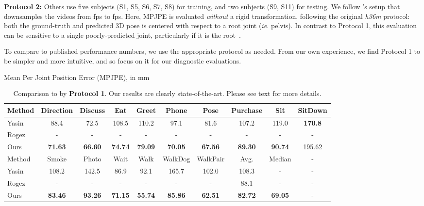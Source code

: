 \documentclass[10pt,twocolumn,letterpaper]{article}
\begin{document}
\textbf{Protocol 2:} Others \cite{Zhou_2016_CVPR,Tekin_2016_CVPR,li20143d} use five subjects (S1, S5, S6, S7, S8)  for training, and two subjects (S9, S11) for testing. We follow \cite{Zhou_2016_CVPR}'s setup that downsamples the videos from  fps to  fps.
Here, MPJPE is evaluated {\em without} a rigid transformation, following the original \textit{h36m} protocol: both the ground-truth and predicted 3D pose is centered with respect to a root joint (\textit{ie.} pelvis). In contrast to Protocol 1, this evaluation can be sensitive to a single poorly-predicted joint, particularly if it is the root~\cite{h36m_pami}.

To compare to published performance numbers, we use the appropriate protocol as needed. From our own experience, we find Protocol 1 to be simpler and more intuitive, and so focus on it for our diagnostic evaluations.



\begin{table*}[t!]
\centering
Mean Per Joint Position Error (MPJPE), in mm\\
\begin{tabular}{|l|c|c|c|c|c|c|c|c|c|}
\hline
Method & Direction & Discuss & Eat & Greet & Phone & Pose & Purchase & Sit & SitDown\\
\hline
\hline
Yasin \cite{Yasin_2016_CVPR}& 88.4 & 72.5 & 108.5 & 110.2 & 97.1 & 81.6 & 107.2 & 119.0 & \textbf{170.8} \\
Rogez \cite{rogez2016mocap}& -&-&-&-&-&-&-&-&-\\
\hline
Ours &\textbf{71.63} &\textbf{66.60} &\textbf{74.74} &\textbf{79.09} &\textbf{70.05} &\textbf{67.56} &\textbf{89.30} &\textbf{90.74} &195.62 \\
\hline
\hline
Method & Smoke & Photo & Wait & Walk & WalkDog & WalkPair & Avg. & Median & -\\
\hline
\hline
Yasin \cite{Yasin_2016_CVPR}& 108.2 & 142.5 & 86.9 & 92.1 & 165.7 & 102.0 & 108.3 & - &-\\
Rogez \cite{rogez2016mocap}&-&-&-&-&-&-& 88.1 & - &-\\
\hline
Ours &\textbf{83.46} &\textbf{93.26} &\textbf{71.15} &\textbf{55.74} &\textbf{85.86} &\textbf{62.51}& \textbf{82.72} & \textbf{69.05}&-\\
\hline
\end{tabular}
\caption{Comparison to \cite{Yasin_2016_CVPR} by \textbf{Protocol 1}. Our results are clearly state-of-the-art. Please see text for more details.}
\label{table: s11_compare}
\end{table*}
\end{document}
